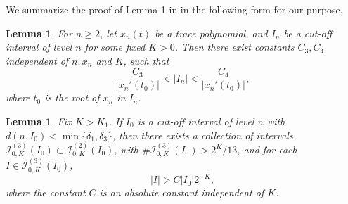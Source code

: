 \documentclass{amsart}
\newtheorem{lemm}[thm]{Lemma}
\theoremstyle{definition}
\begin{document}
We summarize the proof of Lemma 1 in \cite{Last94} 
in the following form for our purpose.

\begin{lemm}
For $n\ge 2$, let $x_n(t)$ be a trace polynomial, 
and $I_n$ be a cut-off interval of level $n$ for some fixed $K>0$.
Then there exist constants $C_3,C_4$ independent of $n, x_n$ and $K$, such that
\begin{equation*}
  \frac{C_3}{|x_{n}'(t_0)|}<|I_n|<\frac{C_4}{|x_{n}'(t_0)|},
\end{equation*}
where $t_0$ is the root of $x_n$ in $I_n$.
\end{lemm}



\begin{lemm}
    \label{length}
Fix $K>K_1$. If $I_0$ is a cut-off interval of level $n$ 
with $d(n,I_0)<\min\{\delta_1,\delta_3\}$,
then there exists a collection of intervals
$\mathcal{I}_{0,K}^{(3)}(I_0)\subset\mathcal{I}_{0,K}^{(2)}(I_0)$,
with $\#\mathcal{I}_{0,K}^{(3)}(I_0)>2^{K}/13$, 
and for each $I\in \mathcal{I}_{0,K}^{(3)}(I_0)$,
\begin{equation}
|I|>C|I_0|2^{-K},
\end{equation}
where the constant $C$ is an absolute constant independent of $K$.
\end{lemm}
\end{document}
